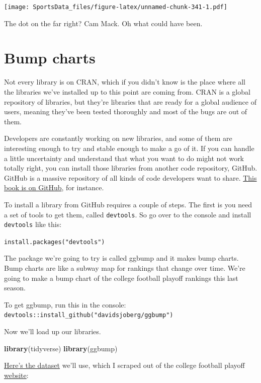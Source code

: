 \documentclass[]{book}
\newenvironment{Shaded}{\begin{snugshade}}{\end{snugshade}}
\newcommand{\KeywordTok}[1]{\textcolor[rgb]{0.13,0.29,0.53}{\textbf{#1}}}
\newcommand{\NormalTok}[1]{#1}
\begin{document}
\texttt{[image: SportsData\_files/figure-latex/unnamed-chunk-341-1.pdf]}

The dot on the far right? Cam Mack. Oh what could have been.

\hypertarget{bump-charts}{%
\chapter{Bump charts}\label{bump-charts}}

Not every library is on CRAN, which if you didn't know is the place where all the libraries we've installed up to this point are coming from. CRAN is a global repository of libraries, but they're libraries that are ready for a global audience of users, meaning they've been tested thoroughly and most of the bugs are out of them.

Developers are constantly working on new libraries, and some of them are interesting enough to try and stable enough to make a go of it. If you can handle a little uncertainty and understand that what you want to do might not work totally right, you can install those libraries from another code repository, GitHub. GitHub is a massive repository of all kinds of code developers want to share. \href{https://github.com/mattwaite/sportsdatabook}{This book is on GitHub}, for instance.

To install a library from GitHub requires a couple of steps. The first is you need a set of tools to get them, called \texttt{devtools}. So go over to the console and install \texttt{devtools} like this:

\texttt{install.packages("devtools")}

The package we're going to try is called ggbump and it makes bump charts. Bump charts are like a subway map for rankings that change over time. We're going to make a bump chart of the college football playoff rankings this last season.

To get ggbump, run this in the console: \texttt{devtools::install\_github("davidsjoberg/ggbump")}

Now we'll load up our libraries.

\begin{Shaded}
\begin{Highlighting}[]
\KeywordTok{library}\NormalTok{(tidyverse)}
\KeywordTok{library}\NormalTok{(ggbump)}
\end{Highlighting}
\end{Shaded}

\href{https://unl.box.com/s/18mzeypa3pgg5pw2xxgawfbhyryo3z3a}{Here's the dataset} we'll use, which I scraped out of the college football playoff \href{https://collegefootballplayoff.com/rankings.aspx}{website}:
\end{document}
